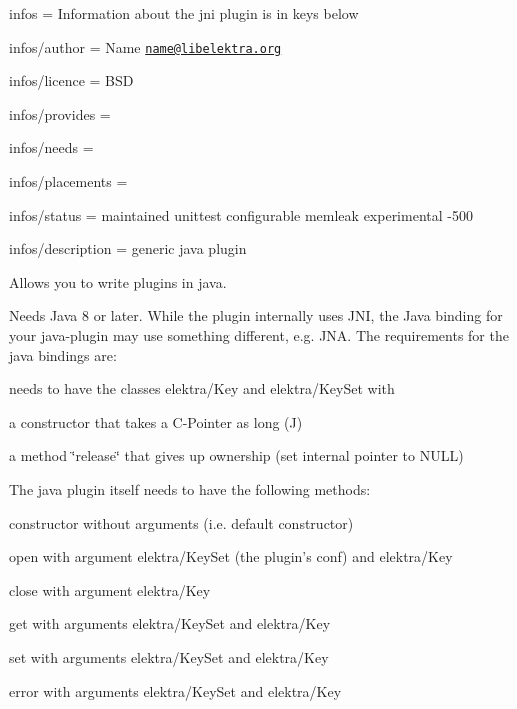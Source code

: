 
\begin{DoxyItemize}
\item infos = Information about the jni plugin is in keys below
\item infos/author = Name \href{mailto:name@libelektra.org}{\tt name@libelektra.\+org}
\item infos/licence = B\+S\+D
\item infos/provides =
\item infos/needs =
\item infos/placements =
\item infos/status = maintained unittest configurable memleak experimental -\/500
\item infos/description = generic java plugin
\end{DoxyItemize}

Allows you to write plugins in java.

Needs Java 8 or later. While the plugin internally uses J\+N\+I, the Java binding for your java-\/plugin may use something different, e.\+g. J\+N\+A. The requirements for the java bindings are\+:


\begin{DoxyItemize}
\item needs to have the classes {\ttfamily elektra/\+Key} and {\ttfamily elektra/\+Key\+Set} with
\begin{DoxyItemize}
\item a constructor that takes a C-\/\+Pointer as long (J)
\item a method \char`\"{}release\char`\"{} that gives up ownership (set internal pointer to N\+U\+L\+L)
\end{DoxyItemize}
\end{DoxyItemize}

The java plugin itself needs to have the following methods\+:


\begin{DoxyItemize}
\item constructor without arguments (i.\+e. default constructor)
\item open with argument {\ttfamily elektra/\+Key\+Set} (the plugin's conf) and {\ttfamily elektra/\+Key}
\item close with argument {\ttfamily elektra/\+Key}
\item get with arguments {\ttfamily elektra/\+Key\+Set} and {\ttfamily elektra/\+Key}
\item set with arguments {\ttfamily elektra/\+Key\+Set} and {\ttfamily elektra/\+Key}
\item error with arguments {\ttfamily elektra/\+Key\+Set} and {\ttfamily elektra/\+Key}
\end{DoxyItemize}

